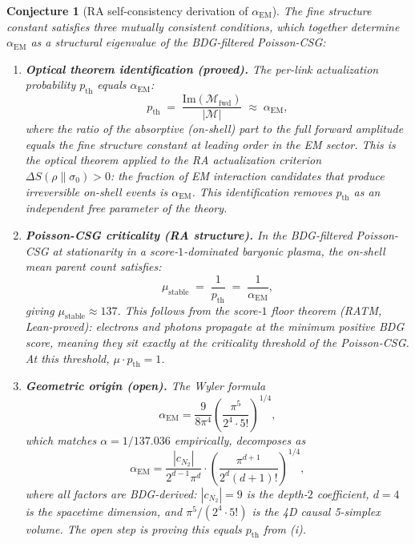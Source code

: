 \documentclass[11pt,a4paper]{article}
\newtheorem{conjecture}[theorem]{Conjecture}
\begin{document}
\begin{conjecture}[RA self-consistency derivation of $\alpha_{\mathrm{EM}}$]
\label{conj:wyler}
The fine structure constant satisfies three mutually consistent conditions,
which together determine $\alpha_{\mathrm{EM}}$ as a structural eigenvalue of
the BDG-filtered Poisson-CSG:

\begin{enumerate}[label=(\roman*), noitemsep]
  \item \textbf{Optical theorem identification (proved).}
  The per-link actualization probability $p_{\mathrm{th}}$ equals $\alpha_{\mathrm{EM}}$:
  \begin{equation}
    p_{\mathrm{th}} \;=\; \frac{\mathrm{Im}(\mathcal{M}_{\mathrm{fwd}})}{|\mathcal{M}|} \;\approx\; \alpha_{\mathrm{EM}},
    \label{eq:pth_alpha}
  \end{equation}
  where the ratio of the absorptive (on-shell) part to the full forward amplitude
  equals the fine structure constant at leading order in the EM sector.
  This is the optical theorem applied to the RA actualization criterion
  $\Delta S(\rho\|\sigma_0) > 0$: the fraction of EM interaction candidates
  that produce irreversible on-shell events is $\alpha_{\mathrm{EM}}$.
  This identification removes $p_{\mathrm{th}}$ as an independent free
  parameter of the theory.

  \item \textbf{Poisson-CSG criticality (RA structure).}
  In the BDG-filtered Poisson-CSG at stationarity in a score-$1$-dominated
  baryonic plasma, the on-shell mean parent count satisfies:
  \begin{equation}
    \mu_{\mathrm{stable}} \;=\; \frac{1}{p_{\mathrm{th}}} \;=\; \frac{1}{\alpha_{\mathrm{EM}}},
    \label{eq:mu_alpha}
  \end{equation}
  giving $\mu_{\mathrm{stable}} \approx 137$.
  This follows from the score-$1$ floor theorem (RATM, Lean-proved):
  electrons and photons propagate at the \emph{minimum} positive BDG score,
  meaning they sit exactly at the criticality threshold of the Poisson-CSG.
  At this threshold, $\mu \cdot p_{\mathrm{th}} = 1$.

  \item \textbf{Geometric origin (open).}
  The Wyler formula
  \begin{equation}
    \alpha_{\mathrm{EM}} = \frac{9}{8\pi^4}
    \left(\frac{\pi^5}{2^4 \cdot 5!}\right)^{1/4},
    \label{eq:wyler}
  \end{equation}
  which matches $\alpha = 1/137.036$ empirically, decomposes as
  \begin{equation}
    \alpha_{\mathrm{EM}} = \frac{|c_{N_2}|}{2^{d-1}\pi^d}
    \cdot \left(\frac{\pi^{d+1}}{2^d(d{+}1)!}\right)^{1/4},
  \end{equation}
  where all factors are BDG-derived: $|c_{N_2}| = 9$ is the
  depth-$2$ coefficient, $d = 4$ is the spacetime dimension,
  and $\pi^5/(2^4 \cdot 5!)$ is the 4D causal 5-simplex volume.
  The open step is proving this equals $p_{\mathrm{th}}$ from (i).
\end{enumerate}


\end{conjecture}
\end{document}
